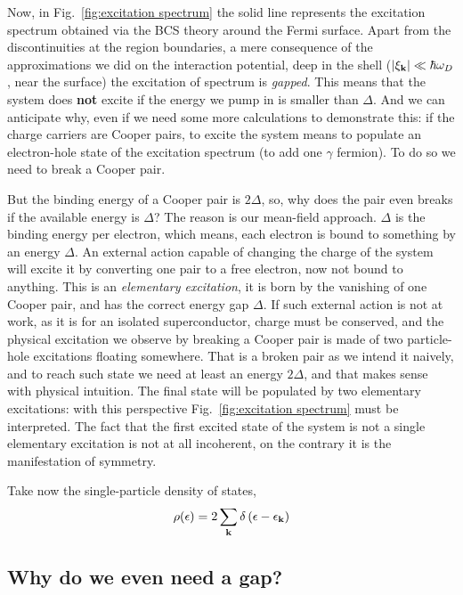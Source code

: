 Now, in Fig.~\ref{fig:excitation spectrum} the solid line represents the excitation spectrum obtained via the BCS theory around the Fermi surface. Apart from the discontinuities at the region boundaries, a mere consequence of the approximations we did on the interaction potential, deep in the shell ($\abs{\xi_\mathbf{k}}\ll\hbar\omega_D$, near the surface) the excitation of spectrum is \textit{gapped}. This means that the system does \textbf{not} excite if the energy we pump in is smaller than $\Delta$. And we can anticipate why, even if we need some more calculations to demonstrate this: if the charge carriers are Cooper pairs, to excite the system means to populate an electron-hole state of the excitation spectrum (to add one $\gamma$ fermion). To do so we need to break a Cooper pair.

But the binding energy of a Cooper pair is $2\Delta$, so, why does the pair even breaks if the available energy is $\Delta$? The reason is our mean-field approach. $\Delta$ is the binding energy per electron, which means, each electron is bound to something by an energy $\Delta$. An external action capable of changing the charge of the system will excite it by converting one pair to a free electron, now not bound to anything. This is an \textit{elementary excitation}, it is born by the vanishing of one Cooper pair, and has the correct energy gap $\Delta$. If such external action is not at work, as it is for an isolated superconductor, charge must be conserved, and the physical excitation we observe by breaking a Cooper pair is made of two particle-hole excitations floating somewhere. That is a broken pair as we intend it naively, and to reach such state we need at least an energy $2\Delta$, and that makes sense with physical intuition. The final state will be populated by two elementary excitations: with this perspective Fig.~\ref{fig:excitation spectrum} must be interpreted. The fact that the first excited state of the system is not a single elementary excitation is not at all incoherent, on the contrary it is the manifestation of symmetry.

Take now the single-particle density of states,
\[
	\rho(\epsilon) = 2 \sum_\mathbf{k} \delta \left({\epsilon-\epsilon_\mathbf{k}}\right)
\]

\subsection{Why do we even need a gap?}

